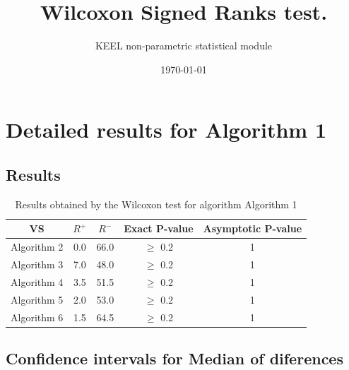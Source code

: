 \documentclass[a4paper,10pt]{article}
\title{Wilcoxon Signed Ranks test.}
\date{\today}
\author{KEEL non-parametric statistical module}
\begin{document}
\pagestyle{empty}
\maketitle
\thispagestyle{empty}



\section{Detailed results for Algorithm 1}


\subsection{Results}

\begin{table}[!htp]
\centering\small
\begin{tabular}{
|c|c|c|c|c|}
\hline
 VS & $R^{+}$ & $R^{-}$ & Exact P-value & Asymptotic P-value \\ \hline 
Algorithm 2 & 0.0 & 66.0 & $\geq$ 0.2 & 1\\ \hline 
Algorithm 3 & 7.0 & 48.0 & $\geq$ 0.2 & 1\\ \hline 
Algorithm 4 & 3.5 & 51.5 & $\geq$ 0.2 & 1\\ \hline 
Algorithm 5 & 2.0 & 53.0 & $\geq$ 0.2 & 1\\ \hline 
Algorithm 6 & 1.5 & 64.5 & $\geq$ 0.2 & 1\\ \hline 

\end{tabular}
\caption{Results obtained by the Wilcoxon test for algorithm Algorithm 1}
\end{table}

\subsection{Confidence intervals for Median of diferences}
\end{document}
